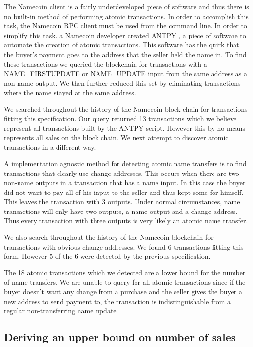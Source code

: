 The Namecoin client is a fairly underdeveloped piece of software and thus there is no built-in method of performing atomic transactions. In order to accomplish this task, the Namecoin RPC client must be used from the command line. In order to simplify this task, a Namecoin developer created ANTPY \cite{antyp}, a piece of software to automate the creation of atomic transactions. This software has the quirk that the buyer's payment goes to the address that the seller held the name in. To find these transactions we queried the blockchain for transactions with a NAME\_FIRSTUPDATE or NAME\_UPDATE input from the same address as a non name output. We then further reduced this set by eliminating transactions where the name stayed at the same address.

We searched throughout the history of the Namecoin block chain for transactions fitting this specification. Our query returned 13 transactions which we believe represent all transactions built by the ANTPY script. However this by no means represents all sales on the block chain. We next attempt to discover atomic transactions in a different way.

A implementation agnostic method for detecting atomic name transfers is to find transactions that clearly use change addresses. This occurs when there are two non-name outputs in a transaction that has a name input. In this case the buyer did not want to pay all of his input to the seller and thus kept some for himself. This leaves the transaction with 3 outputs. Under normal circumstances, name transactions will only have two outputs, a name output and a change address. Thus every transaction with three outputs is very likely an atomic name transfer.

We also search throughout the history of the Namecoin blockchain for transactions with obvious change addresses. We found 6 transactions fitting this form. However 5 of the 6 were detected by the previous specification.

The 18 atomic transactions which we detected are a lower bound for the number of name transfers. We are unable to query for all atomic transactions since if the buyer doesn't want any change from a purchase and the seller gives the buyer a new address to send payment to, the transaction is indistinguishable from a regular non-transferring name update.

\subsection{Deriving an upper bound on number of sales}

